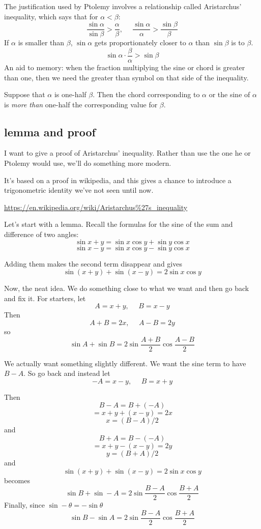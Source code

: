 \documentclass[11pt, oneside]{article}
\begin{document}
The justification used by Ptolemy involves a relationship called Aristarchus' inequality, which says that for $\alpha < \beta$:
\[ \frac{\sin \alpha}{\sin \beta} > \frac{\alpha}{\beta}, \ \ \ \ \ \ \frac{\sin \alpha}{\alpha} > \frac{\sin \beta}{\beta} \]
If $\alpha$ is smaller than $\beta$, $\sin \alpha$ gets proportionately closer to $\alpha$ than $\sin \beta$ is to $\beta$.
\[ \sin \alpha \cdot \frac{\beta}{\alpha} > \sin \beta \]
An aid to memory:  when the fraction multiplying the sine or chord is greater than one, then we need the greater than symbol on that side of the inequality.

Suppose that $\alpha$ is one-half $\beta$.  Then the chord corresponding to $\alpha$ or the sine of $\alpha$ is \emph{more than} one-half the corresponding value for $\beta$.

\subsection*{lemma and proof}
I want to give a proof of Aristarchus' inequality.  Rather than use the one he or Ptolemy would use, we'll do something more modern.  

It's based on a proof in wikipedia, and this gives a chance to introduce a trigonometric identity we've not seen until now.

\url{https://en.wikipedia.org/wiki/Aristarchus%27s_inequality}

Let's start with a lemma.  Recall the formulas for the sine of the sum and difference of two angles:
\[ \sin x + y = \sin x \cos y + \sin y \cos x \]
\[ \sin x - y = \sin x \cos y - \sin y \cos x \]

Adding them makes the second term disappear and gives
\[ \sin (x + y) + \sin (x - y) = 2 \sin x \cos y \]

Now, the neat idea.  We do something close to what we want and then go back and fix it.  For starters, let 
\[ A = x+y, \ \ \ \ \ \ B = x - y \]
Then
\[ A + B = 2x , \ \ \ \ \ \ A - B = 2y \]
so
\[ \sin A + \sin B = 2 \sin \frac{A + B}{2} \cos \frac{A - B}{2} \]

We actually want something slightly different.  We want the sine term to have $B - A$.  So go back and instead let
\[ -A = x - y, \ \ \ \ \ \ B = x + y \]

Then 
\[ B - A = B + (-A) \]
\[ = x + y + (x - y) = 2x \]
\[ x = (B - A)/2 \]
and
\[ B + A = B - (-A) \]
\[ = x + y - (x - y) = 2y \]
\[ y = (B + A)/2 \]
and
\[ \sin (x + y) + \sin (x - y) = 2 \sin x \cos y \]
becomes
\[ \sin B + \sin -A = 2 \sin \frac{B - A}{2} \cos \frac{B + A}{2} \]
Finally, since $\sin - \theta = - \sin \theta$
\[ \sin B - \sin A = 2 \sin \frac{B - A}{2} \cos \frac{B + A}{2} \]
\end{document}
